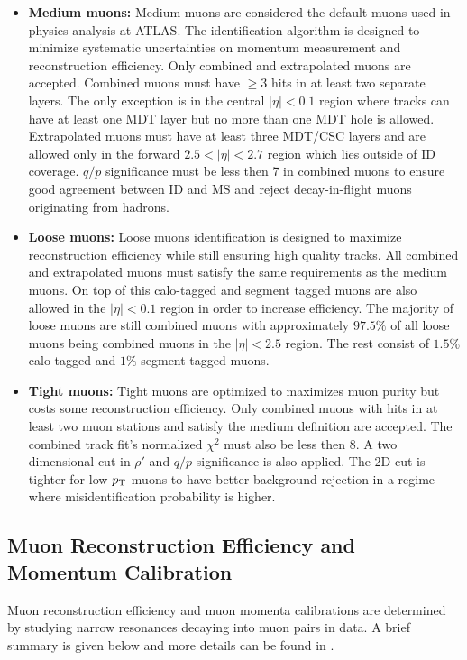 \begin{itemize}
\item[] {\bf Medium muons:} Medium muons are considered the default muons used in physics analysis at ATLAS.  The identification algorithm is designed to minimize systematic uncertainties on momentum measurement and reconstruction efficiency.  Only combined and extrapolated muons are accepted.  Combined muons must have $\ge 3$ hits in at least two separate layers.  The only exception is in the central $|\eta|<0.1$ region where tracks can have at least one MDT layer but no more than one MDT hole is allowed.  Extrapolated muons must have at least three MDT/CSC layers and are allowed only in the forward $2.5 < |\eta| < 2.7$ region which lies outside of ID coverage. $q/p$ significance must be less then 7 in combined muons to ensure good agreement between ID and MS and reject decay-in-flight muons originating from hadrons. 
\item[] {\bf Loose muons:} Loose muons identification is designed to maximize reconstruction efficiency while still ensuring high quality tracks. All combined and extrapolated muons must satisfy the same requirements as the medium muons.  On top of this calo-tagged and segment tagged muons are also allowed in the $|\eta|<0.1$ region in order to increase efficiency.  The majority of loose muons are still combined muons with approximately $97.5\%$ of all loose muons being combined muons in the $|\eta|<2.5$ region.  The rest consist of $1.5\%$ calo-tagged and $1\%$ segment tagged muons.
\item[] {\bf Tight muons:} Tight muons are optimized to maximizes muon purity but costs some reconstruction efficiency.  Only combined muons with hits in at least two muon stations and satisfy the medium definition are accepted.  The combined track fit's normalized $\chi^2$ must also be less then 8.  A two dimensional cut in $\rho\prime$ and $q/p$ significance is also applied.  The 2D cut is tighter for low $p_{\mathrm{T}}$ muons to have better background rejection in a regime where misidentification probability is higher.
\end{itemize}

\subsection{Muon Reconstruction Efficiency and Momentum Calibration}
\label{sec:reco:muonEff}

\indent Muon reconstruction efficiency and muon momenta calibrations are determined by studying narrow resonances decaying into muon pairs in data.  A brief summary is given below and more details can be found in \cite{MuonReco}. \\

